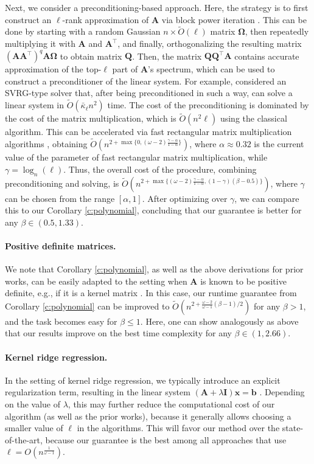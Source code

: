 \documentclass[11pt]{article}
\let\origtop\top
\renewcommand\top{{\scriptscriptstyle{\origtop}}}
\def\x{{\mathbf x}}
\def\b{{\mathbf b}}
\def\A{{\mathbf A}}
\def\I{{\mathbf I}}
\def\Q{{\mathbf Q}}
\begin{document}
Next, we consider a preconditioning-based approach. Here, the strategy is to first construct an $\ell$-rank approximation of $\A$ via block power iteration \cite{halko2011finding}. This can be done by starting with a random Gaussian $n\times \tilde O(\ell)$ matrix $\mathbf{\Omega}$, then repeatedly multiplying it with $\A$ and $\A^\top$, and finally, orthogonalizing the resulting matrix $(\A\A^\top)^q\A\mathbf{\Omega}$ to obtain matrix $\Q$. Then, the matrix $\Q\Q^\top\A$ contains accurate approximation of the top-$\ell$ part of $\A$'s spectrum, which can be used to construct a preconditioner of the linear system. For example, \cite{gonen2016solving,musco2018spectrum} considered an SVRG-type solver that, after being preconditioned in such a way, can solve a linear system in $\tilde O(\bar\kappa_\ell n^2)$ time. The cost of the preconditioning is dominated by the cost of the matrix multiplication, which is $\tilde O(n^2\ell)$ using the classical algorithm. This can be accelerated via fast rectangular matrix multiplication algorithms \cite{le2012faster}, obtaining $\tilde O(n^{2+\max\{0,(\omega-2)\frac{\gamma-\alpha}{1-\alpha}\}})$, where $\alpha\approx 0.32$ is the current value of the parameter of fast rectangular matrix multiplication, while $\gamma = \log_n(\ell)$. Thus, the overall cost of the procedure, combining preconditioning and solving, is $\tilde O(n^{2+\max\{(\omega-2)\frac{\gamma-\alpha}{1-\alpha}, (1-\gamma)(\beta-0.5)\}})$, where $\gamma$ can be chosen from the range $[\alpha,1]$. After optimizing over $\gamma$, we can compare this to our Corollary \ref{c:polynomial}, concluding that our guarantee is better for any $\beta\in(0.5,1.33)$. 

\paragraph{Positive definite matrices.}
We note that Corollary \ref{c:polynomial}, as well as the above derivations for prior works, can  be easily adapted to the setting when $\A$ is known to be positive definite, e.g., if it is a kernel matrix \cite{RasmussenWilliams06}. In this case, our runtime guarantee from Corollary \ref{c:polynomial} can be improved to $\tilde O(n^{2+\frac{\omega-2}{\omega-1}(\beta-1)/2})$ for any $\beta>1$, and the task becomes easy for $\beta\leq 1$. Here, one can show analogously as above that our results improve on the best time complexity for any $\beta\in(1,2.66)$.

\paragraph{Kernel ridge regression.} In the setting of kernel ridge regression, we typically introduce an explicit regularization term, resulting in the linear system $(\A+\lambda\I)\x=\b$ \cite{erdogdu2015convergence}. Depending on the value of $\lambda$, this may further reduce the computational cost of our algorithm (as well as the prior works), because it generally allows choosing a smaller value of $\ell$ in the algorithms. This will favor our method over the state-of-the-art, because our guarantee is the best among all approaches that use $\ell=O(n^{\frac1{\omega-1}})$.



\end{document}
